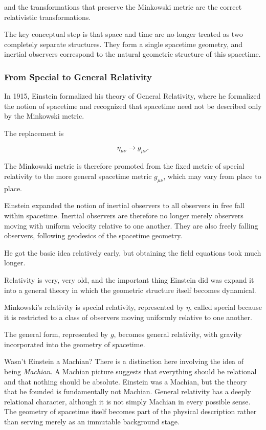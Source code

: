 		and the transformations that preserve the Minkowski metric are the correct relativistic transformations.

		The key conceptual step is that space and time are no longer treated as two completely separate structures. They form a single spacetime geometry, and inertial observers correspond to the natural geometric structure of this spacetime.

		\subsubsection{From Special to General Relativity}

		In 1915, Einstein formalized his theory of General Relativity, where he formalized the notion of spacetime and recognized that spacetime need not be described only by the Minkowski metric.

		The replacement is

		\begin{equation}
			\eta_{\mu\nu}\to g_{\mu\nu}.
		\end{equation}

		The Minkowski metric is therefore promoted from the fixed metric of special relativity to the more general spacetime metric $g_{\mu\nu}$, which may vary from place to place.

		Einstein expanded the notion of inertial observers to all observers in free fall within spacetime. Inertial observers are therefore no longer merely observers moving with uniform velocity relative to one another. They are also freely falling observers, following geodesics of the spacetime geometry.

		He got the basic idea relatively early, but obtaining the field equations took much longer.

		Relativity is very, very old, and the important thing Einstein did was expand it into a general theory in which the geometric structure itself becomes dynamical.

		Minkowski's relativity is special relativity, represented by $\eta$, called special because it is restricted to a class of observers moving uniformly relative to one another.

		The general form, represented by $g$, becomes general relativity, with gravity incorporated into the geometry of spacetime.
	
		\begin{question}{Wasn't Einstein a Machian?}
			There is a distinction here involving the idea of being \textit{Machian}. A Machian picture suggests that everything should be relational and that nothing should be absolute. Einstein was a Machian, but the theory that he founded is fundamentally not Machian.
			General relativity has a deeply relational character, although it is not simply Machian in every possible sense. The geometry of spacetime itself becomes part of the physical description rather than serving merely as an immutable background stage.
		\end{question}
